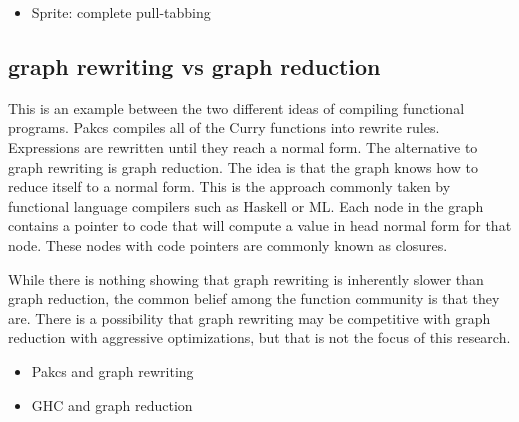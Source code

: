 


\begin{itemize}
  \item Sprite: complete pull-tabbing
\end{itemize}
\subsection{graph rewriting vs graph reduction}
This is an example between the two different ideas of compiling functional programs.
Pakcs compiles all of the Curry functions into rewrite rules.
Expressions are rewritten until they reach a normal form.
The alternative to graph rewriting is graph reduction.
The idea is that the graph knows how to reduce itself to a normal form.
This is the approach commonly taken by functional language compilers such as Haskell or ML.
Each node in the graph contains a pointer to code that will compute a value in head normal form for that node.
These nodes with code pointers are commonly known as closures.

While there is nothing showing that graph rewriting is inherently slower than graph reduction,
the common belief among the function community is that they are.
There is a possibility that graph rewriting may be competitive with graph reduction
with aggressive optimizations, but that is not the focus of this research.

\begin{itemize}
  \item Pakcs and graph rewriting
  \item GHC and graph reduction
\end{itemize}
